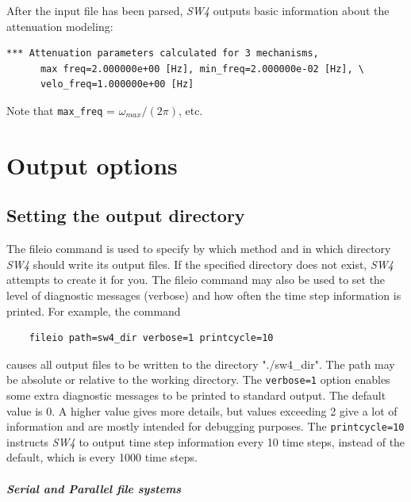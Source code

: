 \documentclass[11pt]{report}
\begin{document}
After the input file has been parsed, \emph{SW4} outputs basic information about the attenuation
modeling:
\begin{verbatim}
*** Attenuation parameters calculated for 3 mechanisms, 
      max freq=2.000000e+00 [Hz], min_freq=2.000000e-02 [Hz], \
      velo_freq=1.000000e+00 [Hz]
\end{verbatim}
Note that \verb+max_freq+ = $\omega_{max}/(2\pi)$, etc.


\chapter{Output options}
\section{Setting the output directory}\label{sec:output-dir}
The fileio command is used to specify by which method and in which directory \emph{SW4} should write
its output files.  If the specified directory does not exist, \emph{SW4} attempts to create it for you. The
fileio command may also be used to set the level of diagnostic messages (verbose) and how often the
time step information is printed. For example, the command
\begin{verbatim}
	fileio path=sw4_dir verbose=1 printcycle=10
\end{verbatim}
causes all output files to be written to the directory "./sw4\_dir". The path may be absolute or
relative to the working directory. The \verb+verbose=1+ option enables some extra diagnostic
messages to be printed to standard output. The default value is 0. A higher value gives more
details, but values exceeding 2 give a lot of information and are mostly intended for debugging
purposes. The \verb+printcycle=10+ instructs \emph{SW4} to output time step information every 10
time steps, instead of the default, which is every 1000 time steps.

\paragraph{Serial and Parallel file systems}
\end{document}

